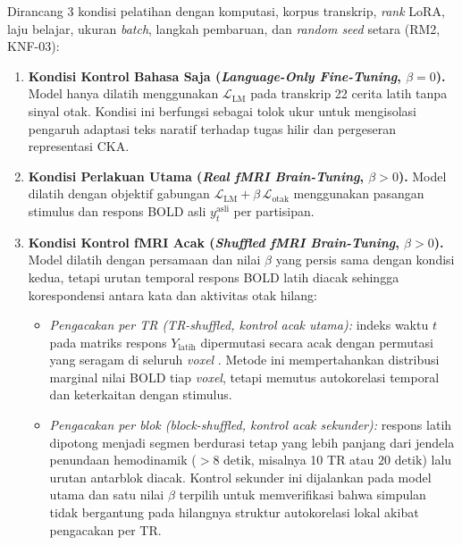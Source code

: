 Dirancang 3 kondisi pelatihan dengan komputasi, korpus transkrip, \textit{rank} LoRA, laju belajar, ukuran \textit{batch}, langkah pembaruan, dan \textit{random seed} setara (RM2, KNF-03):

\begin{enumerate}
  \item \textbf{Kondisi Kontrol Bahasa Saja (\textit{Language-Only Fine-Tuning}, $\beta = 0$).} Model hanya dilatih menggunakan $\mathcal{L}_{\text{LM}}$ pada transkrip 22 cerita latih tanpa sinyal otak. Kondisi ini berfungsi sebagai tolok ukur untuk mengisolasi pengaruh adaptasi teks naratif terhadap tugas hilir dan pergeseran representasi CKA.
  \item \textbf{Kondisi Perlakuan Utama (\textit{Real fMRI Brain-Tuning}, $\beta > 0$).} Model dilatih dengan objektif gabungan $\mathcal{L}_{\text{LM}} + \beta\,\mathcal{L}_{\text{otak}}$ menggunakan pasangan stimulus dan respons BOLD asli $y_t^{\text{asli}}$ per partisipan.
  \item \textbf{Kondisi Kontrol fMRI Acak (\textit{Shuffled fMRI Brain-Tuning}, $\beta > 0$).} Model dilatih dengan persamaan dan nilai $\beta$ yang persis sama dengan kondisi kedua, tetapi urutan temporal respons BOLD latih diacak sehingga korespondensi antara kata dan aktivitas otak hilang:
  \begin{itemize}
    \item \textit{Pengacakan per TR (\textit{TR-shuffled}, kontrol acak utama):} indeks waktu $t$ pada matriks respons $Y_{\text{latih}}$ dipermutasi secara acak dengan permutasi yang seragam di seluruh \textit{voxel} \autocite{negi2025brain}. Metode ini mempertahankan distribusi marginal nilai BOLD tiap \textit{voxel}, tetapi memutus autokorelasi temporal dan keterkaitan dengan stimulus.
    \item \textit{Pengacakan per blok (\textit{block-shuffled}, kontrol acak sekunder):} respons latih dipotong menjadi segmen berdurasi tetap yang lebih panjang dari jendela penundaan hemodinamik ($> 8\text{ detik}$, misalnya 10 TR atau $20\text{ detik}$) lalu urutan antarblok diacak. Kontrol sekunder ini dijalankan pada model utama dan satu nilai $\beta$ terpilih untuk memverifikasi bahwa simpulan tidak bergantung pada hilangnya struktur autokorelasi lokal akibat pengacakan per TR.
  \end{itemize}
\end{enumerate}


